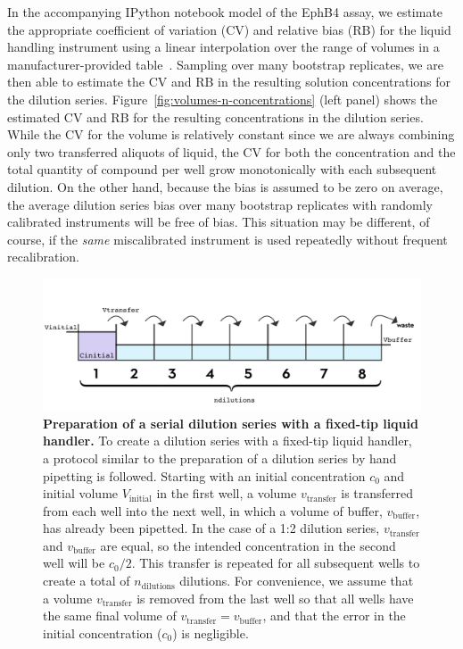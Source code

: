 \documentclass[aps,pre,twocolumn,nofootinbib,superscriptaddress,linenumbers]{revtex4-1}
\begin{document}
In the accompanying IPython notebook model of the EphB4 assay, we estimate the appropriate coefficient of variation (CV) and relative bias (RB) for the liquid handling instrument using a linear interpolation over the range of volumes in a manufacturer-provided table~\cite{_tecan_2001}.
Sampling over many bootstrap replicates, we are then able to estimate the CV and RB in the resulting solution concentrations for the dilution series.
Figure~\ref{fig:volumes-n-concentrations} (left panel) shows the estimated CV and RB for the resulting concentrations in the dilution series.
While the CV for the volume is relatively constant since we are always combining only two transferred aliquots of liquid, the CV for both the concentration and the total quantity of compound per well grow monotonically with each subsequent dilution.
On the other hand, because the bias is assumed to be zero on average, the average dilution series bias over many bootstrap replicates with randomly calibrated instruments will be free of bias.
This situation may be different, of course, if the \emph{same} miscalibrated instrument is used repeatedly without frequent recalibration.


\begin{figure}[tb]
    \includegraphics[width=\columnwidth]{../figures/dilution.pdf}

  \caption{{\bf Preparation of a serial dilution series with a fixed-tip liquid handler.}
  To create a dilution series with a fixed-tip liquid handler, a protocol similar to the preparation of a dilution series by hand pipetting is followed.
  Starting with an initial concentration $c_0$ and initial volume $V_\mathrm{initial}$ in the first well, a volume $v_\mathrm{transfer}$ is transferred from each well into the next well, in which a volume of buffer, $v_\mathrm{buffer}$, has already been pipetted. 
  In the case of a 1:2 dilution series, $v_\mathrm{transfer}$ and $v_\mathrm{buffer}$ are equal, so the intended concentration in the second well will be $c_0/2$. 
  This transfer is repeated for all subsequent wells to create a total of $n_\mathrm{dilutions}$ dilutions. 
  For convenience, we assume that a volume $v_\mathrm{transfer}$ is removed from the last well so that all wells have the same final volume of $v_\mathrm{transfer} = v_\mathrm{buffer}$, and that the error in the initial concentration ($c_0$) is negligible.
  }
  \label{fig:dilution}
\end{figure}
\end{document}
